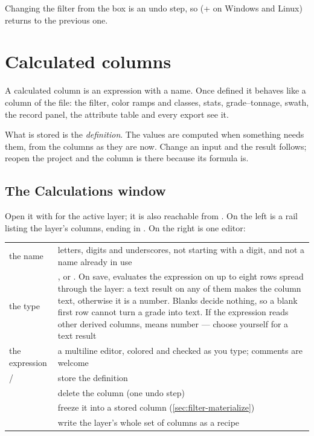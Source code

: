 Changing the filter from the box is an undo step, so  (+ on Windows and Linux) returns to the previous one.

\section{Calculated columns}\label{sec:filter-calc}
A calculated column is an expression with a name. Once defined it behaves like a column of the file: the filter, color ramps and classes, stats, grade–tonnage, swath, the record panel, the attribute table and every export see it.

What is stored is the \emph{definition}. The values are computed when something needs them, from the columns as they are now. Change an input and the result follows; reopen the project and the column is there because its formula is.

\subsection{The Calculations window}
Open it with  for the active layer; it is also reachable from . On the left is a rail listing the layer's  columns, ending in . On the right is one editor:

\begin{center}
\begin{tabularx}{\linewidth}{@{}lL@{}}\toprule
the name & letters, digits and underscores, not starting with a digit, and not a name already in use \\
the type & ,  or . On save,  evaluates the expression on up to eight rows spread through the layer: a text result on any of them makes the column text, otherwise it is a number. Blanks decide nothing, so a blank first row cannot turn a grade into text. If the expression reads other derived columns,  means number — choose  yourself for a text result \\
the expression & a multiline editor, colored and checked as you type; \code{\#} comments are welcome \\
 /  & store the definition \\
 & delete the column (one undo step) \\
 & freeze it into a stored column (\cref{sec:filter-materialize}) \\
 & write the layer's whole set of  columns as a recipe \\ \bottomrule
\end{tabularx}
\end{center}

